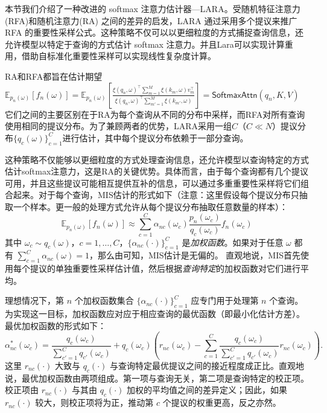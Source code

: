 \label{subsec:lara}

本节我们介绍了一种改进的 softmax 注意力估计器—LARA。受随机特征注意力(RFA)\cite{peng2021random,}和随机注意力(RA)\cite{choromanski2020rethinking} 之间的差异的启发，LARA 通过采用多个提议来推广 RFA 的重要性采样公式。这种策略不仅可以以更细粒度的方式捕捉查询信息，还允许模型以特定于查询的方式估计 softmax 注意力。并且Lara可以实现计算重用，借助自标准化重要性采样可以实现线性复杂度计算。

\label{ssec:lara_mis}
RA和RFA都旨在估计期望 $\mathbb{E}_{p_n(\omega)}\left[f_n(\omega)\right]
 =  \mathbb{E}_{p_n(\omega)}\!\!\left[\frac{\xi(q_n,\omega)^\top \!\sum_{m=1}^M\xi(k_m, \omega) v_{m}^{\top}}{ \xi(q_n,\omega)^\top \!\sum_{m'=1}^M\xi(k_{m'}, \omega)}\right]\!
 = \mathsf{SoftmaxAttn}(q_n, K,V)$
它们之间的主要区别在于RA为每个查询从不同的分布中采样，而RFA对所有查询使用相同的提议分布。为了兼顾两者的优势，LARA采用一组$C$（$C \ll N$）提议分布$\{{q_c(\omega)}\}_{c=1}^C$进行估计，其中每个提议分布依赖于一部分查询。

这种策略不仅能够以更细粒度的方式处理查询信息，还允许模型以查询特定的方式估计softmax注意力，这是RA的关键优势。具体而言，由于每个查询都有几个提议可用，并且这些提议可能相互提供互补的信息，可以通过多重重要性采样\cite{veach1995optimally}将它们组合起来。对于每个查询，MIS估计的形式如下（注意：这里假设每个提议分布只抽取一个样本。更一般的处理方式允许从每个提议分布抽取任意数量的样本）：
\begin{equation}
\mathbb{E}_{p_n(\omega)}\left[f_n(\omega)\right] \approx \sum_{c=1}^C \alpha_{nc}(\omega_c) \frac{p_n(\omega_c)}{q_c(\omega_c)}f_n(\omega_c)\label{eqn:lara:mis}
\end{equation}
其中 $\omega_c \sim q_c(\omega)$，$c=1,\dots,C$，$\{{\alpha_{nc}(\cdot)}\}_{c=1}^C$ 是\emph{加权函数}。如果对于任意 $\omega$ 都有 $\sum_{c=1}^C \alpha_{nc}(\omega) = 1$，那么由\cite{veach1995optimally}可知，MIS估计是无偏的。
直观地说，MIS首先使用每个提议的单独重要性采样估计值，然后根据\emph{查询特定}的加权函数对它们进行平均。

理想情况下，第 $n$ 个加权函数集合 $\{{\alpha_{nc}(\cdot)}\}_{c=1}^C$ 应专门用于处理第 $n$ 个查询。为实现这一目标，加权函数应对应于相应查询的最优函数（即最小化估计方差）。最优加权函数的形式如下：
\begin{equation}
\alpha^*_{nc}(\omega_c) =
\frac{q_c(\omega_c)}{\sum_{c'=1}^C q_{c'}(\omega_c)} + q_c(\omega_c)\left(r_{nc}(\omega_c) - \sum_{c=1}^C\frac{q_c(\omega_c)}{\sum_{c'=1}^C q_{c'}(\omega_c)}r_{nc}(\omega_c)\right).
\end{equation}
这里 $r_{nc}(\cdot)$ 大致与 $q_c(\cdot)$ 与查询特定最优提议之间的接近程度成正比。直观地说，最优加权函数由两项组成。第一项与查询无关，第二项是查询特定的校正项。校正项由 $r_{nc}(\cdot)$ 与其由 $q_c(\cdot)$ 加权的平均值之间的差异定义；因此，如果 $r_{nc}(\cdot)$ 较大，则校正项将为正，推动第 $c$ 个提议的权重更高，反之亦然。

